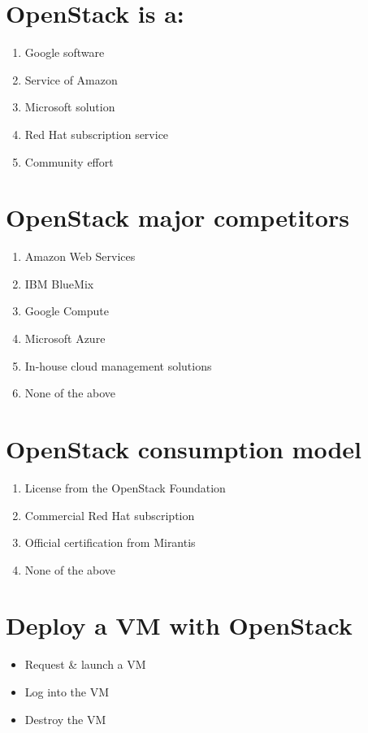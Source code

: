 \documentclass[11pt]{article}
\begin{document}
\section*{OpenStack is a:}
\label{sec:org9bf2672}
\begin{enumerate}
\item Google software
\item Service of Amazon
\item Microsoft solution
\item Red Hat subscription service
\item Community effort
\end{enumerate}

\section*{OpenStack major competitors}
\label{sec:org357b57b}
\begin{enumerate}
\item Amazon Web Services
\item IBM BlueMix
\item Google Compute
\item Microsoft Azure
\item In-house cloud management solutions
\item None of the above
\end{enumerate}

\section*{OpenStack consumption model}
\label{sec:org330a11d}
\begin{enumerate}
\item License from the OpenStack Foundation
\item Commercial Red Hat subscription
\item Official certification from Mirantis
\item None of the above
\end{enumerate}

\section*{Deploy a VM with OpenStack}
\label{sec:org3c275ce}
\begin{itemize}
\item Request \& launch a VM
\item Log into the VM
\item Destroy the VM
\end{itemize}
\end{document}
